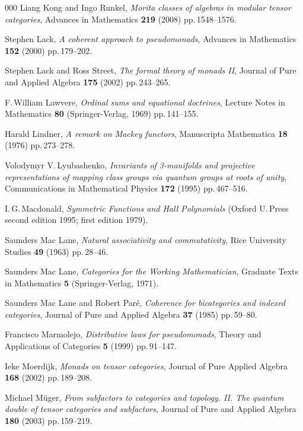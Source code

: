 \documentclass[a4paper,12pt]{article}
\theoremstyle{definition}
\theoremstyle{fact}
\theoremstyle{genquest}
\theoremstyle{step}
\begin{document}
\begin{thebibliography}{000}
 Liang Kong and Ingo Runkel, \textit{Morita classes of algebras in modular tensor categories}, Advances in Mathematics \textbf{219} (2008) pp.\,1548--1576.

 Stephen Lack, \textit{A coherent approach to pseudomonads}, Advances in Mathematics \textbf{152} (2000) pp.\,179--202. 

 Stephen Lack and Ross Street, \textit{The formal theory of monads II}, Journal of Pure and Applied Algebra \textbf{175} (2002) pp.\,243--265. 

 F.\,William Lawvere, \textit{Ordinal sums and equational doctrines},  Lecture Notes in Mathematics \textbf{80} (Springer-Verlag, 1969) pp.\,141--155.

 Harald Lindner, \textit{A remark on Mackey functors}, Manuscripta Mathematica \textbf{18} (1976) pp.\,273--278.

 Volodymyr V.\,Lyubashenko, \textit{Invariants of 3-manifolds and projective representations of mapping class groups via quantum groups at roots of unity}, Communications in Mathematical Physics \textbf{172} (1995) pp.\,467--516.

 I.\,G.\,Macdonald, \textit{Symmetric Functions and Hall Polynomials} (Oxford U.\,Press second edition 1995; first edition 1979).

 Saunders Mac Lane, \textit{Natural associativity and commutativity}, Rice University Studies \textbf{49} (1963) pp.\,28--46.

 Saunders Mac Lane, \textit{Categories for the Working Mathematician}, Graduate Texts in Mathematics \textbf{5} (Springer-Verlag, 1971). 

 Saunders Mac Lane and Robert Par\'e, \textit{Coherence for bicategories and indexed categories}, Journal of Pure and Applied Algebra \textbf{37} (1985) pp.\,59--80.

 Francisco Marmolejo, \textit{Distributive laws for pseudomonads}, Theory and Applications of Categories \textbf{5} (1999) pp.\,91--147.

 Ieke Moerdijk, \textit{Monads on tensor categories}, Journal of Pure Applied Algebra \textbf{168} (2002) pp.\,189--208.

 Michael M\"uger, \textit{From subfactors to categories and topology. II. The quantum double of tensor categories and subfactors}, Journal of Pure and Applied Algebra \textbf{180} (2003) pp.\,159--219.


\end{thebibliography}
\end{document}
